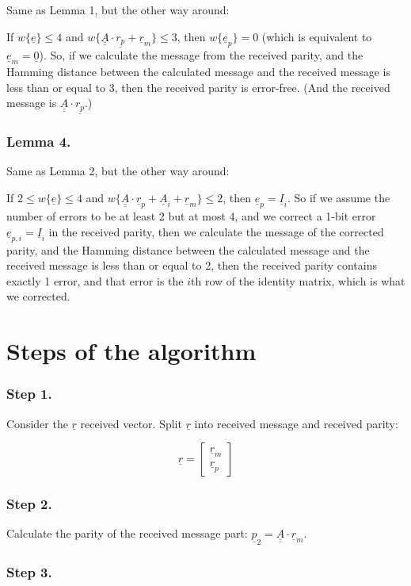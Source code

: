 \documentclass[11pt,a4paper,oneside]{report}             %
\def\doubleunderline#1{\underline{\underline{#1}}}
\def\dul#1{\doubleunderline{#1}}
\def\ul#1{\underline{#1}}
\newcommand{\vect}[2]{\begin{bmatrix} #1 \\ #2 \end{bmatrix}}
\begin{document}
Same as Lemma 1, but the other way around:

If $w\{\ul{e}\} \leq 4$ and $w\{\dul{A} \cdot \ul {r_p} + \ul{r}_m\} \leq 3$,
then $w\{\ul{e}_p\} = 0$  (which is equivalent to $\ul{e}_m = \ul{0}$).
So, if we calculate the message from the received parity, and
the Hamming distance between the calculated message and the received message is less than
or equal to 3, then the received parity is error-free. (And the received message is
$\dul{A} \cdot \ul {r_p}$.)

\subsubsection{Lemma 4.}

Same as Lemma 2, but the other way around:

If $2 \leq w\{\ul{e}\} \leq 4$ and $w\{\dul{A} \cdot \ul{r}_p + \ul{A}_i + \ul{r}_m\} \leq 2$,
then $\ul{e}_p = \ul{I}_i$. So if we assume the number of errors to be at least 2 but at most 4,
and we correct a 1-bit error $\ul{e}_{p, i} = \ul{I}_i$ in the received parity, then we calculate
the message of the corrected parity, and the Hamming distance between the calculated message and
the received message is less than or equal to 2, then the received parity contains exactly 1 error,
and that error is the $i$th row of the identity matrix, which is what we corrected.

\section{Steps of the algorithm}

\subsubsection{Step 1.}

Consider the $\ul{r}$ received vector.
Split $\ul{r}$ into received message and received parity:

\[
    \ul{r} = \vect{\ul{r}_m}{\ul{r}_p}
\]

\subsubsection{Step 2.}

Calculate the parity of the received message part: $\ul{p}_2 = \dul{A} \cdot \ul{r}_m$.

\subsubsection{Step 3.}
\end{document}
